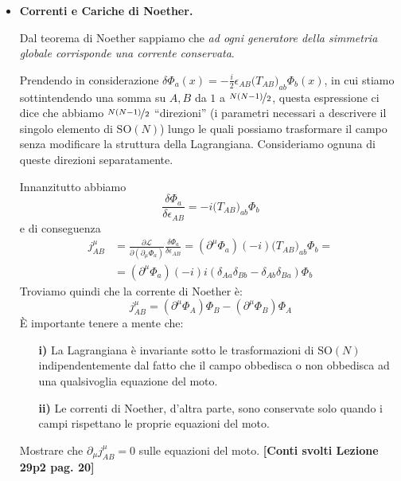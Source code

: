 \documentclass[../main.tex]{subfiles}
\begin{document}
\begin{itemize}
    \item \textbf{Correnti e Cariche di Noether.}

    Dal teorema di Noether sappiamo che \textit{ad ogni generatore della simmetria globale corrisponde una corrente conservata}.

    Prendendo in considerazione $\delta \Phi_a(x) = -\frac{i}{2}\epsilon_{AB}\big(T_{AB}\big)_{ab}\Phi_b(x)$, in cui stiamo sottintendendo una somma su $A,B$ da $1$ a $\nicefrac{N(N-1)}{2}$, questa espressione ci dice che abbiamo $\nicefrac{N(N-1)}{2}$ “direzioni” (i parametri necessari a descrivere il singolo elemento di $\textrm{SO}(N)$) lungo le quali possiamo trasformare il campo senza modificare la struttura della Lagrangiana. Consideriamo ognuna di queste direzioni separatamente.

    Innanzitutto abbiamo
    \[
    \frac{\delta \Phi_a}{\delta\epsilon_{AB}} = -i\big(T_{AB}\big)_{ab}\Phi_b
    \]
    e di conseguenza 
    \begin{align*}
        j^\mu_{AB} &= \frac{\partial\mathscr{L}}{\partial(\partial_\mu\Phi_a)}\frac{\delta \Phi_a}{\delta\epsilon_{AB}} = (\partial^\mu\Phi_a)(-i)\big(T_{AB}\big)_{ab}\Phi_b = \\
        &=(\partial^\mu\Phi_a)(-i)i(\delta_{Aa}\delta_{Bb} - \delta_{Ab}\delta_{Ba})\Phi_b
    \end{align*}
    Troviamo quindi che la corrente di Noether è:
    \begin{equation}
        \boxed{j^\mu_{AB} = (\partial^\mu\Phi_A)\Phi_B - (\partial^\mu\Phi_B)\Phi_A}
        \label{eq:noeth_curr_SON}
    \end{equation}
    È importante tenere a mente che:
    \begin{enumerate}
        \item[\textbf{i)}] La Lagrangiana è invariante sotto le trasformazioni di $\textrm{SO}(N)$ indipendentemente dal fatto che il campo obbedisca o non obbedisca ad una qualsivoglia equazione del moto.
        \item[\textbf{ii)}] Le correnti di Noether, d'altra parte, sono conservate solo quando i campi rispettano le proprie equazioni del moto.
    \end{enumerate}
    \begin{exercise}
        Mostrare che $\partial_\mu j^\mu_{AB} = 0$ sulle equazioni del moto. \textbf{[Conti svolti Lezione 29p2 pag. 20]}
        \label{ex:current_is_conserved_on_EOM}
    \end{exercise}


\end{itemize}
\end{document}
